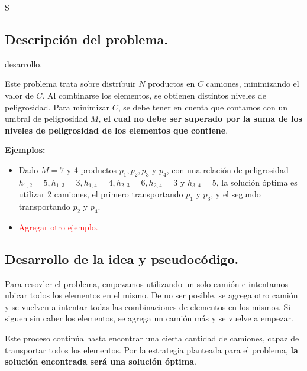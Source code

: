 S\subsection{Descripción del problema.}

\vspace*{0.3cm}

desarrollo.

\vspace*{0.75cm} \noindent

Este problema trata sobre distribuir $N$ productos en $C$ camiones, minimizando
el valor de $C$. Al combinarse los elementos, se obtienen distintos niveles de peligrosidad.
Para minimizar $C$, se debe tener en cuenta que contamos con un umbral de peligrosidad
$M$, \textbf{el cual no debe ser superado por la suma de los niveles de peligrosidad de los
elementos que contiene}.

\vspace*{0.5cm}

\textbf{Ejemplos:}
\begin{itemize}
  \item Dado $M = 7$ y 4 productos $p_1, p_2, p_3$ y $p_4$, con una relación
  de peligrosidad $h_{1,2} = 5, h_{1,3} = 3, h_{1,4} = 4, h_{2,3} = 6, h_{2,4} =
  3$ y $h_{3,4} = 5$, la solución óptima es utilizar 2 camiones, el primero
  transportando $p_1$ y $p_3$, y el segundo transportando $p_2$ y $p_4$.
  
  \item \textcolor{red}{Agregar otro ejemplo.}
\end{itemize}



\subsection{Desarrollo de la idea y pseudocódigo.}

Para resovler el problema, empezamos utilizando un solo camión e intentamos ubicar 
todos los elementos en el mismo. De no ser posible, se agrega otro camión y se vuelven 
a intentar todas las combinaciones de elementos en los mismos. Si siguen sin caber los
elementos, se agrega un camión más y se vuelve a empezar.

Este proceso continúa hasta encontrar una cierta cantidad de camiones, capaz de 
transportar todos los elementos. Por la estrategia planteada para el problema, 
\textbf{la solución encontrada será una solución óptima}.

\vspace*{0.5cm}


